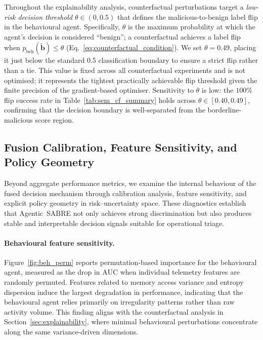 \documentclass[lettersize,journal]{IEEEtran}
\begin{document}
Throughout the explainability analysis, counterfactual perturbations target a
\emph{low-risk decision threshold} $\theta \in (0, 0.5)$ that defines the malicious-to-benign
label flip in the behavioural agent. Specifically, $\theta$ is the maximum probability at
which the agent's decision is considered ``benign''; a counterfactual achieves a label flip
when $p_{\mathrm{beh}}(\tilde{\mathbf{b}}) \le \theta$ (Eq.~\ref{eq:counterfactual_condition}).
We set $\theta = 0.49$, placing it just below the standard 0.5 classification boundary to
ensure a strict flip rather than a tie. This value is fixed across all counterfactual
experiments and is not optimised; it represents the tightest practically achievable flip
threshold given the finite precision of the gradient-based optimiser. Sensitivity to $\theta$
is low: the $100\%$ flip success rate in Table~\ref{tab:sem_cf_summary} holds across
$\theta \in [0.40, 0.49]$, 
\cbstart
confirming that the decision boundary is well-separated from the
borderline-malicious score region.
\cbend


\subsection{Fusion Calibration, Feature Sensitivity, and Policy Geometry}
\label{sec:fusion_analysis}

Beyond aggregate performance metrics, we examine the internal behaviour of the fused decision mechanism through calibration analysis, feature sensitivity, and explicit policy geometry in risk--uncertainty space. These diagnostics establish that Agentic~SABRE not only achieves strong discrimination but also produces stable and interpretable decision signals suitable for operational triage.

\paragraph{Behavioural feature sensitivity.}
Figure~\ref{fig:beh_perm} reports permutation-based importance for the behavioural agent, measured as the drop in AUC when individual telemetry features are randomly permuted. Features related to memory access variance and entropy dispersion induce the largest degradation in performance, indicating that the behavioural agent relies primarily on irregularity patterns rather than raw activity volume. This finding aligns with the counterfactual analysis in Section~\ref{sec:explainability}, where minimal behavioural perturbations concentrate along the same variance-driven dimensions.
\end{document}
